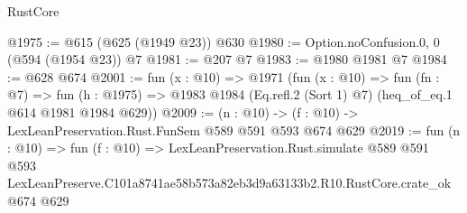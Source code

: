 \begin{lexlean}{RustCore}
\begin{coremodule}
@1975 := @615 (@625 (@1949 @23)) @630
@1980 := Option.noConfusion.{0, 0} (@594 (@1954 @23)) @7
@1981 := @207 @7
@1983 := @1980 @1981 @7
@1984 := @628 @674
@2001 := fun (x : @10) =>
  @1971
    (fun (x : @10) =>
    fun (fn : @7) =>
    fun (h : @1975) => @1983 @1984 (Eq.refl.{2} (Sort 1) @7) (heq_of_eq.{1} @614 @1981 @1984 @629))
@2009 := (n : @10) -> (f : @10) -> LexLeanPreservation.Rust.FunSem @589 @591 @593 @674 @629
@2019 := fun (n : @10) =>
  fun (f : @10) =>
  LexLeanPreservation.Rust.simulate
    @589
    @591
    @593
    LexLeanPreserve.C101a8741ae58b573a82eb3d9a63133b2.R10.RustCore.crate_ok
    @674
    @629
\end{coremodule}
\end{lexlean}
